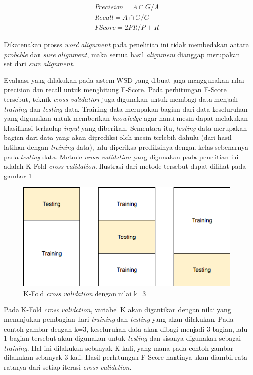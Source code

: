 \begin{equation}
\begin{split}
Precision = A \cap G / A \\
Recall = A \cap G / G \\
FScore = 2 P R / P + R
\end{split}
\end{equation}

Dikarenakan proses \textit{word alignment} pada penelitian ini tidak membedakan antara \textit{probable} dan \textit{sure alignment}, maka semua hasil \textit{alignment} dianggap merupakan set dari \textit{sure alignment}.

Evaluasi yang dilakukan pada sistem WSD yang dibuat juga menggunakan nilai precision dan recall untuk menghitung F-Score. Pada perhitungan F-Score tersebut, teknik \textit{cross validation} juga digunakan untuk membagi data menjadi \textit{training} dan \textit{testing} data. Training data merupakan bagian dari data keseluruhan yang digunakan untuk memberikan \textit{knowledge} agar nanti mesin dapat melakukan klasifikasi terhadap \textit{input} yang diberikan. Sementara itu, \textit{testing} data merupakan bagian dari data yang akan diprediksi oleh mesin terlebih dahulu (dari hasil latihan dengan \textit{training} data), lalu diperiksa prediksinya dengan kelas sebenarnya pada \textit{testing} data. Metode \textit{cross validation} yang digunakan pada penelitian ini adalah K-Fold \textit{cross validation}. Ilustrasi dari metode tersebut dapat dilihat pada gambar \ref{fig:cross_val}.

\begin{figure}
	\centering
	\includegraphics[width=1\linewidth]{adit_pics/cross_validation}
	\caption{K-Fold \textit{cross validation} dengan nilai k=3}
	\label{fig:cross_val}
\end{figure}

Pada K-Fold \textit{cross validation}, variabel K akan digantikan dengan nilai yang menunjukan pembagian dari \textit{training} dan \textit{testing} yang akan dilakukan. Pada contoh gambar dengan k=3, keseluruhan data akan dibagi menjadi 3 bagian, lalu 1 bagian tersebut akan digunakan untuk \textit{testing} dan sisanya digunakan sebagai \textit{training}. Hal ini dilakukan sebanyak K kali, yang mana pada contoh gambar dilakukan sebanyak 3 kali. Hasil perhitungan F-Score nantinya akan diambil rata-ratanya dari setiap iterasi \textit{cross validation}.